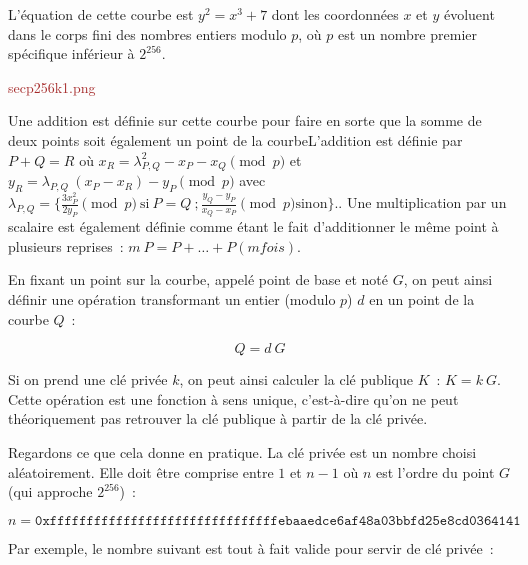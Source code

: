 L'équation de cette courbe est $y^2 = x^3 + 7$ dont les coordonnées $x$ et $y$ évoluent dans le corps fini des nombres entiers modulo $p$, où $p$ est un nombre premier spécifique inférieur à $2^{256}$. 

\textcolor{brown}{secp256k1.png}

Une addition est définie sur cette courbe pour faire en sorte que la somme de deux points soit également un point de la courbe{L'addition est définie par $P + Q = R$ où $x_R = \lambda_{P,Q}^2 - x_P - x_Q \pmod p$ et $y_R = \lambda_{P,Q}~( x_P - x_R ) - y_P \pmod p$ avec $\lambda_{P,Q} = \{ \frac{3 x_P^2}{2 y_P} \pmod p~\mathrm{si}~P = Q~;  \frac{y_Q - y_P}{x_Q - x_P} \pmod p \mathrm{sinon} \}$.}. Une multiplication par un scalaire est également définie comme étant le fait d'additionner le même point à plusieurs reprises~: $m~P = P + \ldots + P (m fois)$.

En fixant un point sur la courbe, appelé point de base et noté $G$, on peut ainsi définir une opération transformant un entier (modulo $p$) $d$ en un point de la courbe $Q$~:

\[
Q = d~G
\]

Si on prend une clé privée $k$, on peut ainsi calculer la clé publique $K$~: $K = k~G$. Cette opération est une fonction à sens unique, c'est-à-dire qu'on ne peut théoriquement pas retrouver la clé publique à partir de la clé privée. 


Regardons ce que cela donne en pratique. La clé privée est un nombre choisi aléatoirement. Elle doit être comprise entre $1$ et $n - 1$ où $n$ est l'ordre du point $G$ (qui approche $2^{256}$)~: 

{ \footnotesize
\[
n = \mathtt{0xfffffffffffffffffffffffffffffffebaaedce6af48a03bbfd25e8cd0364141}
\]
}

Par exemple, le nombre suivant est tout à fait valide pour servir de clé privée~:

